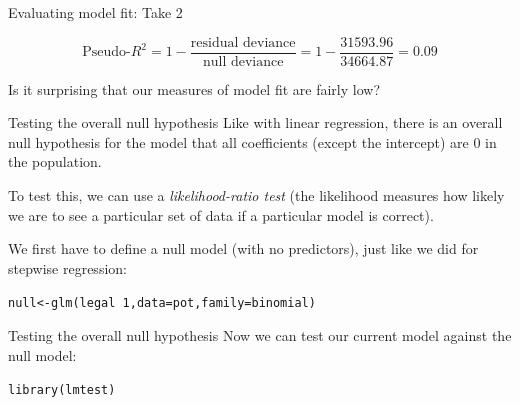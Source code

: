 \documentclass{beamer}\usepackage[]{graphicx}\usepackage[]{color}
\makeatletter
\newcommand{\hlnum}[1]{\textcolor[rgb]{0.824,0.412,0.118}{#1}}%
\newcommand{\hlopt}[1]{\textcolor[rgb]{1,0.894,0.769}{#1}}%
\newcommand{\hlstd}[1]{\textcolor[rgb]{1,0.894,0.769}{#1}}%
\newcommand{\hlkwb}[1]{\textcolor[rgb]{0.804,0.776,0.451}{#1}}%
\newcommand{\hlkwc}[1]{\textcolor[rgb]{0.78,0.941,0.545}{#1}}%
\newcommand{\hlkwd}[1]{\textcolor[rgb]{1,0.78,0.769}{#1}}%
\newenvironment{kframe}{%
 \def\at@end@of@kframe{}%
 \ifinner\ifhmode%
  \def\at@end@of@kframe{\end{minipage}}%
  \begin{minipage}{\columnwidth}%
 \fi\fi%
 \def\FrameCommand##1{\hskip\@totalleftmargin \hskip-\fboxsep
 \colorbox{shadecolor}{##1}\hskip-\fboxsep
     \hskip-\linewidth \hskip-\@totalleftmargin \hskip\columnwidth}%
 \MakeFramed {\advance\hsize-\width
   \@totalleftmargin\z@ \linewidth\hsize
   \@setminipage}}%
 {\par\unskip\endMakeFramed%
 \at@end@of@kframe}
\newenvironment{knitrout}{}{} %
\makeatother
\begin{document}
\begin{darkframes}
    \begin{frame}{Evaluating model fit: Take 2}
      
      \[
        \text{Pseudo-}R^2 = 1 - \frac{\text{residual deviance}}{\text{null deviance}} = 
        1 - \frac{31593.96}{34664.87} = 0.09
      \]

      \pause\bigskip

      \fontsize{11}{11}\selectfont
      Is it surprising that our measures of model fit are fairly low?
    \end{frame}

    \begin{frame}[fragile]{Testing the overall null hypothesis}
      Like with linear regression, there is an overall null hypothesis for the model that all coefficients (except the intercept) are 0 in the population.

      \bigskip\pause

      To test this, we can use a \emph{likelihood-ratio test} (the likelihood measures how likely we are to see a particular set of data if a particular model is correct).

      \bigskip\pause

      We first have to define a null model (with no predictors), just like we did for stepwise regression:
\begin{knitrout}
\begin{kframe}
\begin{alltt}
\hlstd{null} \hlkwb{<-} \hlkwd{glm}\hlstd{(legal} \hlopt{~} \hlnum{1}\hlstd{,} \hlkwc{data}\hlstd{=pot,} \hlkwc{family}\hlstd{=binomial)}
\end{alltt}
\end{kframe}
\end{knitrout}
    \end{frame}

    \begin{frame}[fragile]{Testing the overall null hypothesis}
      Now we can test our current model against the null model: 
      \fontsize{9}{9}\selectfont
\begin{knitrout}
\begin{kframe}
\begin{alltt}
\hlkwd{library}\hlstd{(lmtest)}
\end{alltt}


{\ttfamily\noindent\color{warningcolor}{Warning: package 'lmtest' was built under R version 3.3.2}}


\end{kframe}
\end{knitrout}
\end{frame}
\end{darkframes}
\end{document}
